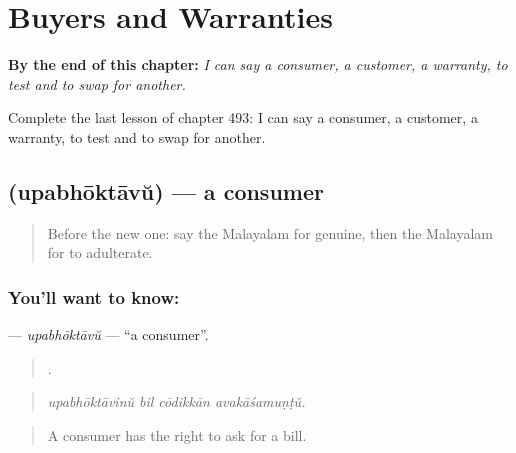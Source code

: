 
\chapter{Buyers and Warranties}
\label{ch:ml-buyers-and-warranties}

\begin{chapteropening}
\textbf{By the end of this chapter:} \emph{I can say a consumer, a customer, a warranty, to test and to swap for another.}

Complete the last lesson of chapter 493: I can say a consumer, a customer, a warranty, to test and to swap for another.
\end{chapteropening}

\section[\texorpdfstring{\ml{ഉപഭോക്താവ്} (upabhōktāvŭ)}{ഉപഭോക്താവ് (upabhōktāvŭ)}]{ (upabhōktāvŭ) — a consumer}

\label{lesson:ML-C493-upabhoktavu}



\begin{quote}
Before the new one: say the Malayalam for genuine, then the Malayalam for to adulterate.
\end{quote}

\subsection*{You'll want to know: }
\textbf{} — \emph{upabhōktāvŭ} — \textquotedblleft{}a consumer\textquotedblright{}.

\begin{quote}
   .
\end{quote}

\begin{quote}
\emph{upabhōktāvinŭ bil cōdikkān avakāśamuṇṭŭ.}
\end{quote}

\begin{quote}
A consumer has the right to ask for a bill.
\end{quote}

